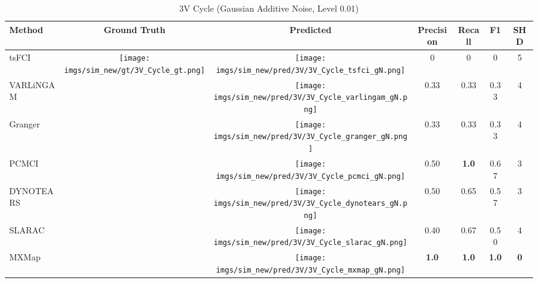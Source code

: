 \begin{table}[htb]
\begin{tabular}{l|c|c|c|c|c|c}
Method    & Ground Truth      & Predicted & Precision    & Recall       & F1           & SHD        \\ \hline
tsFCI     & \multirow{7}{*}[-6.2em]{\begin{minipage}{.17\linewidth} \centering \texttt{[image: imgs/sim\_new/gt/3V\_Cycle\_gt.png]} \end{minipage}} & \begin{minipage}{.17\linewidth} \centering \texttt{[image: imgs/sim\_new/pred/3V/3V\_Cycle\_tsfci\_gN.png]} \end{minipage}    & 0            & 0            & 0            & 5          \\
VARLiNGAM &                   &  \begin{minipage}{.17\linewidth} \centering \texttt{[image: imgs/sim\_new/pred/3V/3V\_Cycle\_varlingam\_gN.png]} \end{minipage}  & 0.33         & 0.33         & 0.33         & 4          \\
Granger   &                   &  \begin{minipage}{.17\linewidth} \centering \texttt{[image: imgs/sim\_new/pred/3V/3V\_Cycle\_granger\_gN.png]} \end{minipage} & 0.33         & 0.33         & 0.33         & 4          \\
PCMCI     &                   &  \begin{minipage}{.17\linewidth} \centering \texttt{[image: imgs/sim\_new/pred/3V/3V\_Cycle\_pcmci\_gN.png]} \end{minipage} & 0.50         & \textbf{1.0} & 0.67         & 3          \\
DYNOTEARS &                   & \begin{minipage}{.17\linewidth} \centering \texttt{[image: imgs/sim\_new/pred/3V/3V\_Cycle\_dynotears\_gN.png]} \end{minipage}& 0.50         & 0.65         & 0.57         & 3          \\
SLARAC    &                   & \begin{minipage}{.17\linewidth} \centering \texttt{[image: imgs/sim\_new/pred/3V/3V\_Cycle\_slarac\_gN.png]} \end{minipage} & 0.40         & 0.67         & 0.50         & 4          \\ \cline{1-1} \cline{3-7} 
MXMap     &                   & \begin{minipage}{.17\linewidth} \centering \texttt{[image: imgs/sim\_new/pred/3V/3V\_Cycle\_mxmap\_gN.png]} \end{minipage} & \textbf{1.0} & \textbf{1.0} & \textbf{1.0} & \textbf{0}
\end{tabular}
\caption{3V Cycle (Gaussian Additive Noise, Level 0.01)}
\label{tab:3V_Cycle_gN}
\end{table}


